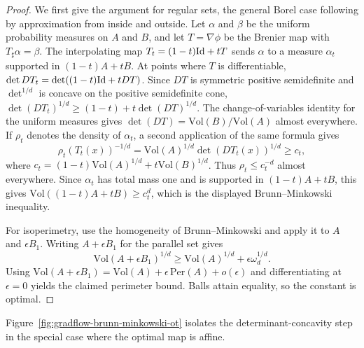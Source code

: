 \begin{proof}
	We first give the argument for regular sets, the general Borel case following by approximation from inside and outside. Let $\alpha$ and $\beta$ be the uniform probability measures on $A$ and $B$, and let $T=\nabla\phi$ be the Brenier map with $T_\sharp\alpha=\beta$. The interpolating map $T_t=(1-t)\mathrm{Id}+tT$ sends $\alpha$ to a measure $\alpha_t$ supported in $(1-t)A+tB$. At points where $T$ is differentiable,
	\(\det DT_t = \det((1-t)\mathrm{Id}+tDT)\).
	Since $DT$ is symmetric positive semidefinite and $\det^{1/d}$ is concave on the positive semidefinite cone,
	\(\det(DT_t)^{1/d} \geq (1-t)+t\det(DT)^{1/d}\).
	The change-of-variables identity for the uniform measures gives $\det(DT)=\mathrm{Vol}(B)/\mathrm{Vol}(A)$ almost everywhere. If $\rho_t$ denotes the density of $\alpha_t$, a second application of the same formula gives
	\[
		\rho_t(T_t(x))^{-1/d}
		=
		\mathrm{Vol}(A)^{1/d}\det(DT_t(x))^{1/d}
		\geq
		c_t,
	\]
	where $c_t=(1-t)\mathrm{Vol}(A)^{1/d}+t\mathrm{Vol}(B)^{1/d}$. Thus $\rho_t\leq c_t^{-d}$ almost everywhere. Since $\alpha_t$ has total mass one and is supported in $(1-t)A+tB$, this gives $\mathrm{Vol}((1-t)A+tB)\geq c_t^d$, which is the displayed Brunn--Minkowski inequality.

	For isoperimetry, use the homogeneity of Brunn--Minkowski and apply it to $A$ and $\epsilon B_1$. Writing $A+\epsilon B_1$ for the parallel set gives
	\[
		\mathrm{Vol}(A+\epsilon B_1)^{1/d}
		\geq
		\mathrm{Vol}(A)^{1/d}+\epsilon\omega_d^{1/d}.
	\]
	Using $\mathrm{Vol}(A+\epsilon B_1)=\mathrm{Vol}(A)+\epsilon\,\mathrm{Per}(A)+o(\epsilon)$ and differentiating at $\epsilon=0$ yields the claimed perimeter bound. Balls attain equality, so the constant is optimal.
\end{proof}

Figure~\ref{fig:gradflow-brunn-minkowski-ot} isolates the determinant-concavity step in the special case where the optimal map is affine.

